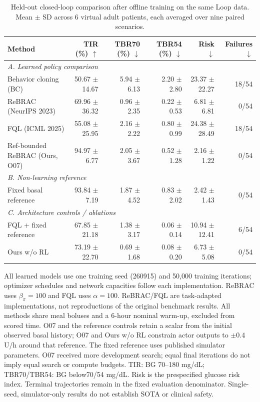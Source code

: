 \begin{table}[t]
\centering
\footnotesize
\caption{Held-out closed-loop comparison after offline training on the same Loop data. Mean $\pm$ SD across 6 virtual adult patients, each averaged over nine paired scenarios.}
\label{tab:rl-heldout}
\begin{tabular*}{\textwidth}{@{\extracolsep{\fill}}lrrrrr@{}}
\toprule
Method & TIR (\%) $\uparrow$ & TBR70 (\%) $\downarrow$ & TBR54 (\%) $\downarrow$ & Risk $\downarrow$ & Failures $\downarrow$ \\
\midrule
\multicolumn{6}{l}{\textit{A. Learned policy comparison}} \\
Behavior cloning (BC) & 50.67 $\pm$ 14.67 & 5.94 $\pm$ 6.13 & 2.20 $\pm$ 2.80 & 23.37 $\pm$ 22.27 & 18/54 \\
ReBRAC (NeurIPS 2023) & 69.96 $\pm$ 36.32 & 0.96 $\pm$ 2.35 & 0.22 $\pm$ 0.53 & 6.81 $\pm$ 6.81 & 0/54 \\
FQL (ICML 2025) & 55.08 $\pm$ 25.95 & 2.16 $\pm$ 2.22 & 0.80 $\pm$ 0.99 & 24.38 $\pm$ 28.49 & 18/54 \\
Ref-bounded ReBRAC (Ours, O07) & 94.97 $\pm$ 6.77 & 2.05 $\pm$ 3.67 & 0.52 $\pm$ 1.28 & 2.16 $\pm$ 1.22 & 0/54 \\
\midrule
\multicolumn{6}{l}{\textit{B. Non-learning reference}} \\
Fixed basal reference & 93.84 $\pm$ 7.19 & 1.87 $\pm$ 4.52 & 0.83 $\pm$ 2.02 & 2.42 $\pm$ 1.43 & 0/54 \\
\midrule
\multicolumn{6}{l}{\textit{C. Architecture controls / ablations}} \\
FQL + fixed reference & 67.85 $\pm$ 21.18 & 1.38 $\pm$ 3.17 & 0.06 $\pm$ 0.14 & 10.94 $\pm$ 12.41 & 6/54 \\
Ours w/o RL & 73.19 $\pm$ 22.70 & 0.69 $\pm$ 1.68 & 0.08 $\pm$ 0.20 & 6.73 $\pm$ 5.08 & 0/54 \\
\bottomrule
\end{tabular*}
\vspace{2pt}
\begin{minipage}{\textwidth}\scriptsize
All learned models use one training seed (260915) and 50,000 training iterations; optimizer schedules and network capacities follow each implementation. ReBRAC uses $\beta_\pi=100$ and FQL uses $\alpha=100$. ReBRAC/FQL are task-adapted implementations, not reproductions of the original benchmark results. All methods share meal boluses and a 6-hour nominal warm-up, excluded from scored time. O07 and the reference controls retain a scalar from the initial observed basal history; O07 and Ours w/o RL constrain actor outputs to $\pm0.4$ U/h around that reference. The fixed reference uses published simulator parameters. O07 received more development search; equal final iterations do not imply equal search or compute budgets. TIR: BG 70--180 mg/dL; TBR70/TBR54: BG below70/54 mg/dL. Risk is the prespecified glucose risk index. Terminal trajectories remain in the fixed evaluation denominator. Single-seed, simulator-only results do not establish SOTA or clinical safety.
\end{minipage}
\end{table}

